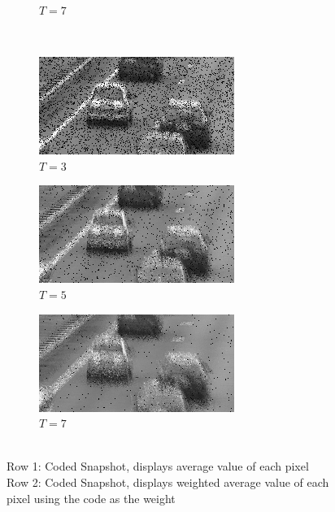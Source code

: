 \documentclass[a4paper, landscape]{article}
\begin{document}
\begin{figure}[H]
\begin{subfigure}{0.2\linewidth}
		\caption{$T=7$}
	\end{subfigure}\\
	\begin{subfigure}{0.2\linewidth}
		\centering
		\includegraphics[width=\linewidth]{cars/coded snapshot weighted averaging, T = 3.png}
		\caption{$T=3$}
	\end{subfigure}
	\begin{subfigure}{0.2\linewidth}
		\centering
		\includegraphics[width=\linewidth]{cars/coded snapshot weighted averaging, T = 5.png}
		\caption{$T=5$}
	\end{subfigure}
	\begin{subfigure}{0.2\linewidth}
		\centering
		\includegraphics[width=\linewidth]{cars/coded snapshot weighted averaging, T = 7.png}
		\caption{$T=7$}
	\end{subfigure}
	\caption{\\Row 1: Coded Snapshot, displays average value of each pixel\\Row 2: Coded Snapshot, displays weighted average value of each pixel using the code as the weight}
	\label{fig:ccs}
\end{figure}
\end{document}

